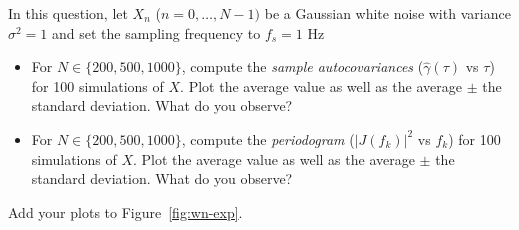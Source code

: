 \documentclass[11pt]{article}
\begin{document}
\begin{exercise}\label{ex:wn-exp}
    In this question, let $X_n$ ($n=0,\dots,N-1)$ be a Gaussian white noise with variance $\sigma^2=1$ and set the sampling frequency to $f_s=1$ Hz
    \begin{itemize}
        \item For $N\in\{200, 500, 1000\}$, compute the \textit{sample autocovariances} ($\hat{\gamma}(\tau)$ vs $\tau$) for 100 simulations of $X$.
        Plot the average value as well as the average $\pm$ the standard deviation.
        What do you observe?
        \item For $N\in\{200, 500, 1000\}$, compute the \textit{periodogram} ($|J(f_k)|^2$ vs $f_k$) for 100 simulations of $X$.
        Plot the average value as well as the average $\pm$ the standard deviation.
        What do you observe?
    \end{itemize}
    Add your plots to Figure~\ref{fig:wn-exp}.


\end{exercise}
\end{document}
